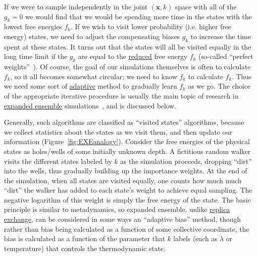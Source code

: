 \documentclass[9pt,review]{livecoms}
\newcommand{\vx}{\mathbf{x}}
\begin{document}
If we were to sample independently in the joint $(\vx,k)$ space with all of the $g_k=0$
we would find that we would be spending more time in the states with the lowest free energies $f_k$.  If we wish to visit
  lower probability (i.e. higher free energy) states, we need to adjust the compensating biases $g_k$ to increase the time spent at these states. It turns out that the states will all be visited equally in the long time limit if the $g_k$ are equal to the \hyperlink{ref:reduced} {reduced} free
    energy $f_k$ (so-called ``perfect weights''~\cite{park-pande:pre:2007:choosing-weights-simulated-tempering}).
    Of course, the goal of our simulations
    themselves is often to calculate $f_k$, so it all
    becomes somewhat circular; we need to know $f_k$ to calculate $f_k$.
    Thus we need some sort of \hyperlink{ref:Adaptive} {adaptive} method to gradually learn $f_k$
    as we go. The choice of the appropriate iterative procedure is usually the main topic of research in \hyperlink{ref:ExpEns} {expanded ensemble} simulations~\cite{lyubartsev:jcp:1992:expanded-ensembles,marinari-parisi:europhys-lett:1992:simulated-tempering,wang-landau:prl:2001:wang-landau,park-ensign-pande:pre:2006:bayesian-weight-update,park-pande:pre:2007:choosing-weights-simulated-tempering,li-fajer-yang:jcp:2007:simulated-scaling,chelli:jctc:2010:optimal-weights-expanded-ensembles}, and is discussed below.

Generally, such algorithms are classified as ``visited states''
algorithms, because we collect statistics about the states as we visit
them, and then update our information (Figure~\ref{fig:EXEanalogy}). Consider the free energies of
the physical states as holes/wells of some initially unknown depth.  A
fictitious random walker visits the different states labeled by
$k$ as the simulation proceeds, dropping ``dirt'' into the
wells, thus gradually building up the importance weights.  At the end
of the simulation, when all states are visited equally, one counts how
much much ``dirt'' the walker has added to each state's weight to
achieve equal sampling. The negative logarithm of this weight is simply
the free energy of the state. The basic principle is similar to metadynamics, so expanded ensemble, unlike \hyperlink{ref:ReplEx} {replica exchange}, can be considered in some ways an ``adaptive bias'' method, though rather than bias being calculated as a function of some collective coordinate, the bias is calculated as a function of the parameter that $k$ labels (such as $\lambda$ or temperature) that controls the thermodynamic state.
\end{document}
